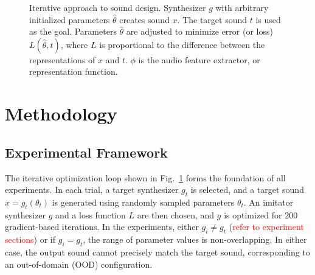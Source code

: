 \documentclass[runningheads]{llncs}
\newcommand{\todo}[1]{\textcolor{red}{#1}}
\begin{document}
\begin{figure}[ht]
    \centering
{}

\caption[Iterative approach to sound design.]{
Iterative approach to sound design. Synthesizer \(g\) with arbitrary initialized parameters \(\hat{\theta}\)
creates sound \(x\). The target sound \(t\) is used as the goal.
Parameters \(\hat{\theta}\) are adjusted to minimize error (or loss)
\(L(\hat{\theta},t)\), where \(L\) is proportional to the difference between
the representations of \(x\) and \(t\). \(\phi\) is the audio feature extractor, or representation function.
}
\label{fig:sound_design_loop_iterative}
\end{figure}



\section{Methodology}
\label{sec:experiment_setup}

\subsection{Experimental Framework}
The iterative optimization loop shown in Fig.~\ref{fig:sound_design_loop_iterative} forms the foundation of all experiments.  
In each trial, a target synthesizer $g_t$ is selected, and a target sound $x = g_t(\theta_t)$ is generated using randomly sampled parameters $\theta_t$.  
An imitator synthesizer $g$ and a loss function $L$ are then chosen, and $g$ is optimized for 200 gradient-based iterations.  In the experiments, either $g_i \neq g_t$ (\todo{refer to experiment sections}) or if $g_i = g_t$, the range of parameter values is non-overlapping. In either case, the output sound cannot precisely match the target sound, corresponding to an out-of-domain (OOD) configuration.
\end{document}
